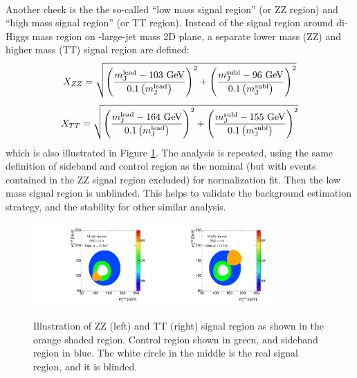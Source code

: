 \paragraph{}
Another check is the the so-called ``low mass signal region'' (or ZZ region) and ``high mass signal region'' (or TT region). 
Instead of the signal region around di-Higgs mass region on \mleadJ-\msublJ large-\R jet mass 2D plane, a separate lower mass (ZZ) and higher mass (TT) signal region are defined: 
\begin{equation}
X_{ZZ} = \sqrt{\left(\frac{m^{\rm lead}_{\rm J} - \text{103 GeV}}{0.1 \left(m^{\rm lead}_{\rm J}\right)}\right)^2 + \left(\frac{m^{\rm subl}_{\rm J}- \text{96 GeV}}{0.1 \left(m^{\rm subl}_{\rm J}\right)}\right)^2}
\label{eq:boosted_Xzz}
\end{equation}
\begin{equation}
X_{TT} = \sqrt{\left(\frac{m^{\rm lead}_{\rm J} - \text{164 GeV}}{0.1 \left(m^{\rm lead}_{\rm J}\right)}\right)^2 + \left(\frac{m^{\rm subl}_{\rm J}- \text{155 GeV}}{0.1 \left(m^{\rm subl}_{\rm J}\right)}\right)^2}
\label{eq:boosted_Xtt}
\end{equation}
which is also illustrated in Figure \ref{CRSB:ZZIllustration}. 
The analysis is repeated, using the same definition of sideband and control region as the nominal (but with events contained in the ZZ signal region excluded) for normalization fit. 
Then the low mass signal region is unblinded. 
This helps to validate the background estimation strategy, and the stability for other similar analysis.

\begin{figure}[htb!]
\begin{center}
\includegraphics[width=0.4\textwidth,angle=-90]{figures/boosted/ZZ/Compare_NoTag_mH0H1.pdf}
\includegraphics[width=0.4\textwidth,angle=-90]{figures/boosted/TT/Compare_NoTag_mH0H1.pdf}
\end{center}
\caption{Illustration of ZZ (left) and TT (right) signal region as shown in the orange shaded region. Control region shown in green, and sideband region in blue. The white circle in the middle is the real signal region, and it is blinded.}
\label{CRSB:ZZIllustration}
\end{figure}

